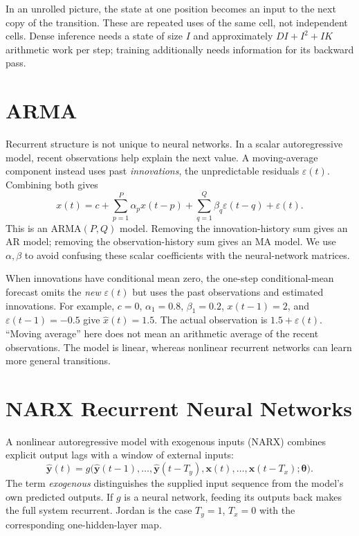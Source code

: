 \documentclass[11pt, oneside]{book}
\newcommand{\params}{\boldsymbol{\theta}}   %
\let\originalsection\section
\renewcommand{\section}{\Needspace{7\baselineskip}\originalsection}
\begin{document}
In an unrolled picture, the state at one position becomes an input to the next copy of the transition. These are repeated uses of the same cell, not independent cells. Dense inference needs a state of size $I$ and approximately $DI+I^2+IK$ arithmetic work per step; training additionally needs information for its backward pass.

\section{ARMA}\label{sec:source-1-4}
Recurrent structure is not unique to neural networks. In a scalar autoregressive model, recent observations help explain the next value. A moving-average component instead uses past \emph{innovations}, the unpredictable residuals $\varepsilon(t)$. Combining both gives
\[
 x(t)=c+\sum_{p=1}^{P}\alpha_p x(t-p)
          +\sum_{q=1}^{Q}\beta_q\varepsilon(t-q)+\varepsilon(t).
\]
This is an ARMA$(P,Q)$ model. Removing the innovation-history sum gives an AR model; removing the observation-history sum gives an MA model. We use $\alpha,\beta$ to avoid confusing these scalar coefficients with the neural-network matrices.

When innovations have conditional mean zero, the one-step conditional-mean forecast omits the \emph{new} $\varepsilon(t)$ but uses the past observations and estimated innovations. For example, $c=0$, $\alpha_1=0.8$, $\beta_1=0.2$, $x(t-1)=2$, and $\varepsilon(t-1)=-0.5$ give $\widehat{x}(t)=1.5$. The actual observation is $1.5+\varepsilon(t)$. ``Moving average'' here does not mean an arithmetic average of the recent observations. The model is linear, whereas nonlinear recurrent networks can learn more general transitions.

\section{NARX Recurrent Neural Networks}\label{sec:source-1-5}
A nonlinear autoregressive model with exogenous inputs (NARX) combines explicit output lags with a window of external inputs:
\[
 \widehat{\mathbf{y}}(t)=g\bigl(
 \widehat{\mathbf{y}}(t-1),\ldots,\widehat{\mathbf{y}}(t-T_y),
 \mathbf{x}(t),\ldots,\mathbf{x}(t-T_x);\params\bigr).
\]
The term \emph{exogenous} distinguishes the supplied input sequence from the model's own predicted outputs. If $g$ is a neural network, feeding its outputs back makes the full system recurrent. Jordan is the case $T_y=1$, $T_x=0$ with the corresponding one-hidden-layer map.
\end{document}
